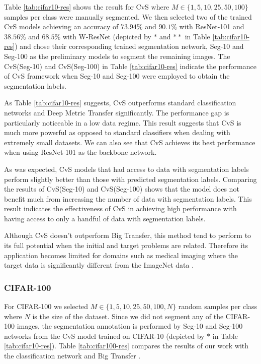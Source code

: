 \documentclass[conference]{IEEEtran}
\begin{document}
Table \ref{tab:cifar10-res} shows the result for CvS where $M \in \{1, 5, 10, 25, 50, 100\}$ samples per class were manually segmented. We then selected two of the trained CvS models achieving an accuracy of $73.94\%$ and $90.1\%$ with ResNet-101 and $38.56\%$ and $68.5\%$ with W-ResNet (depicted by $*$ and $**$ in Table \ref{tab:cifar10-res}) and chose their corresponding trained segmentation network, Seg-10 and Seg-100 as the preliminary models to segment the remaining images. The CvS(Seg-10) and CvS(Seg-100) in Table \ref{tab:cifar10-res} indicate the performance of CvS framework when Seg-10 and Seg-100 were employed to obtain the segmentation labels. 

As Table \ref{tab:cifar10-res} suggests, CvS outperforms standard classification networks and Deep Metric Transfer significantly. The performance gap is particularly noticeable in a low data regime. This result suggests that CvS is much more powerful as opposed to standard classifiers when dealing with extremely small datasets. We can also see that CvS achieves its best performance when using ResNet-101 as the backbone network.

As was expected, CvS models that had access to data with segmentation labels perform slightly better than those with predicted segmentation labels. Comparing the results of CvS(Seg-10) and CvS(Seg-100) shows that the model does not benefit much from increasing the number of data with segmentation labels. This result indicates the effectiveness of CvS in achieving high performance with having access to only a handful of data with segmentation labels.

Although CvS doesn't outperform Big Transfer, this method tend to perform to its full potential when the initial and target problems are related. Therefore its application becomes limited for domains such as medical imaging where the target data is significantly different from the ImageNet data \cite{williams2020limits, yosinskiunderstanding}.
\subsubsection{CIFAR-100}
For CIFAR-100 we selected $M \in \{1, 5, 10, 25, 50, 100, N\}$ random samples per class where $N$ is the size of the dataset. Since we did not segment any of the CIFAR-100 images, the segmentation annotation is performed by Seg-10 and Seg-100 networks from the CvS model trained on CIFAR-10 (depicted by $*$ in Table \ref{tab:cifar10-res}). Table \ref{tab:cifar100-res} compares the results of our work with the classification network and Big Transfer \cite{kolesnikov2019big}.
\end{document}
